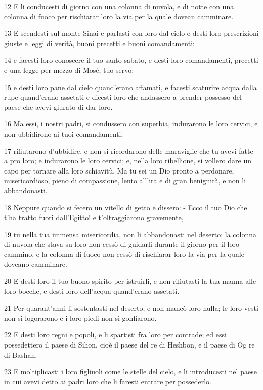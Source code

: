 \par 12 E li conducesti di giorno con una colonna di nuvola, e di notte con una colonna di fuoco per rischiarar loro la via per la quale dovean camminare.
\par 13 E scendesti sul monte Sinai e parlasti con loro dal cielo e desti loro prescrizioni giuste e leggi di verità, buoni precetti e buoni comandamenti:
\par 14 e facesti loro conoscere il tuo santo sabato, e desti loro comandamenti, precetti e una legge per mezzo di Mosè, tuo servo;
\par 15 e desti loro pane dal cielo quand'erano affamati, e facesti scaturire acqua dalla rupe quand'erano assetati e dicesti loro che andassero a prender possesso del paese che avevi giurato di dar loro.
\par 16 Ma essi, i nostri padri, si condussero con superbia, indurarono le loro cervici, e non ubbidirono ai tuoi comandamenti;
\par 17 rifiutarono d'ubbidire, e non si ricordarono delle maraviglie che tu avevi fatte a pro loro; e indurarono le loro cervici; e, nella loro ribellione, si vollero dare un capo per tornare alla loro schiavitù. Ma tu sei un Dio pronto a perdonare, misericordioso, pieno di compassione, lento all'ira e di gran benignità, e non li abbandonasti.
\par 18 Neppure quando si fecero un vitello di getto e dissero: - Ecco il tuo Dio che t'ha tratto fuori dall'Egitto! e t'oltraggiarono gravemente,
\par 19 tu nella tua immensa misericordia, non li abbandonasti nel deserto: la colonna di nuvola che stava su loro non cessò di guidarli durante il giorno per il loro cammino, e la colonna di fuoco non cessò di rischiarar loro la via per la quale doveano camminare.
\par 20 E desti loro il tuo buono spirito per istruirli, e non rifiutasti la tua manna alle loro bocche, e desti loro dell'acqua quand'erano assetati.
\par 21 Per quarant'anni li sostentasti nel deserto, e non mancò loro nulla; le loro vesti non si logorarono e i loro piedi non si gonfiarono.
\par 22 E desti loro regni e popoli, e li spartisti fra loro per contrade; ed essi possedettero il paese di Sihon, cioè il paese del re di Heshbon, e il paese di Og re di Bashan.
\par 23 E moltiplicasti i loro figliuoli come le stelle del cielo, e li introducesti nel paese in cui avevi detto ai padri loro che li faresti entrare per possederlo.
